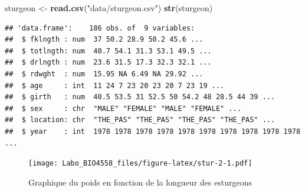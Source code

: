\documentclass[12pt,]{book}
\newenvironment{Shaded}{\begin{snugshade}}{\end{snugshade}}
\newcommand{\CommentTok}[1]{\textcolor[rgb]{0.37,0.37,0.37}{\textit{#1}}}
\newcommand{\DataTypeTok}[1]{\textcolor[rgb]{0.27,0.27,0.27}{#1}}
\newcommand{\KeywordTok}[1]{\textcolor[rgb]{0.27,0.27,0.27}{\textbf{#1}}}
\newcommand{\NormalTok}[1]{#1}
\newcommand{\OperatorTok}[1]{\textcolor[rgb]{0.43,0.43,0.43}{\textbf{#1}}}
\newcommand{\OtherTok}[1]{\textcolor[rgb]{0.37,0.37,0.37}{#1}}
\newcommand{\StringTok}[1]{\textcolor[rgb]{0.5,0.5,0.5}{#1}}
\begin{document}
\begin{Shaded}
\begin{Highlighting}[]
\NormalTok{sturgeon <-}\StringTok{ }\KeywordTok{read.csv}\NormalTok{(}\StringTok{"data/sturgeon.csv"}\NormalTok{)}
\KeywordTok{str}\NormalTok{(sturgeon)}
\end{Highlighting}
\end{Shaded}

\begin{verbatim}
## 'data.frame':	186 obs. of  9 variables:
##  $ fklngth : num  37 50.2 28.9 50.2 45.6 ...
##  $ totlngth: num  40.7 54.1 31.3 53.1 49.5 ...
##  $ drlngth : num  23.6 31.5 17.3 32.3 32.1 ...
##  $ rdwght  : num  15.95 NA 6.49 NA 29.92 ...
##  $ age     : int  11 24 7 23 20 23 20 7 23 19 ...
##  $ girth   : num  40.5 53.5 31 52.5 50 54.2 48 28.5 44 39 ...
##  $ sex     : chr  "MALE" "FEMALE" "MALE" "FEMALE" ...
##  $ location: chr  "THE_PAS" "THE_PAS" "THE_PAS" "THE_PAS" ...
##  $ year    : int  1978 1978 1978 1978 1978 1978 1978 1978 1978 1978 ...
\end{verbatim}

\begin{Shaded}
\end{Shaded}

\begin{figure}
\centering
\texttt{[image: Labo\_BIO4558\_files/figure-latex/stur-2-1.pdf]}
\caption{\label{fig:stur-2}Graphique du poids en fonction de la longueur des esturgeons}
\end{figure}
\end{document}

